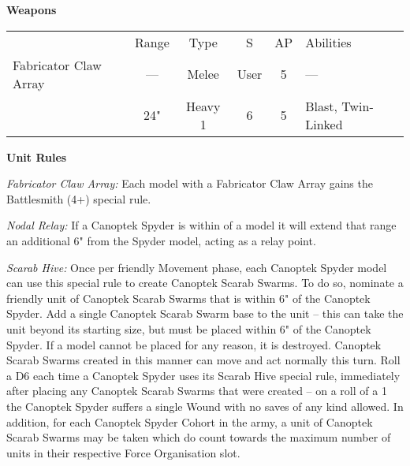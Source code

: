 \begin{minipage}[t]{0.72\textwidth}
	\vspace*{2em}
	\textbf{Weapons}
	
	\begin{tabular}{m{95 pt} *{4}{c} >{\raggedright\arraybackslash}p{130pt}}
		& Range & Type & S & AP & Abilities \\
		Fabricator Claw Array & — & Melee & User & 5 & — \\
		\quickref{Particle Beamer} & 24" & Heavy 1 & 6 & 5 & Blast, Twin-Linked \\
	\end{tabular}
	
	\vspace*{2em}
	\textbf{Unit Rules}
	
	\textit{Fabricator Claw Array:} Each model with a Fabricator Claw Array gains the Battlesmith (4+) special rule.
	
	\textit{Nodal Relay:} If a Canoptek Spyder is within  of a model it will extend that range an additional 6" from the Spyder model, acting as a relay point.
	
	\textit{Scarab Hive:} Once per friendly Movement phase, each Canoptek Spyder model can use this special rule to create Canoptek Scarab Swarms. To do so, nominate a friendly unit of Canoptek Scarab Swarms that is within 6" of the Canoptek Spyder. Add a single Canoptek Scarab Swarm base to the unit – this can take the unit beyond its starting size, but must be placed within 6" of the Canoptek Spyder. If a model cannot be placed for any reason, it is destroyed. Canoptek Scarab Swarms created in this manner can move and act normally this turn. Roll a D6 each time a Canoptek Spyder uses its Scarab Hive special rule, immediately after placing any Canoptek Scarab Swarms that were created – on a roll of a 1 the Canoptek Spyder suffers a single Wound with no saves of any kind allowed. In addition, for each Canoptek Spyder Cohort in the army, a unit of Canoptek Scarab Swarms may be taken which do count towards the maximum number of units in their respective Force Organisation slot.
	

\end{minipage}

